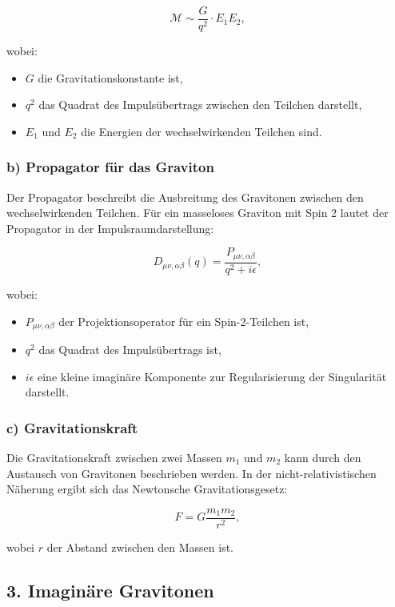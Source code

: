 \documentclass{article}
\begin{document}
\[
\mathcal{M} \sim \frac{G}{q^2} \cdot E_1 E_2,
\]

wobei:

\begin{itemize}
	\item $G$ die Gravitationskonstante ist,
	\item $q^2$ das Quadrat des Impulsübertrags zwischen den Teilchen darstellt,
	\item $E_1$ und $E_2$ die Energien der wechselwirkenden Teilchen sind.
\end{itemize}

\subsubsection{b) Propagator für das Graviton}

Der Propagator beschreibt die Ausbreitung des Gravitonen zwischen den wechselwirkenden Teilchen. Für ein masseloses Graviton mit Spin 2 lautet der Propagator in der Impulsraumdarstellung:

\[
D_{\mu\nu,\alpha\beta}(q) = \frac{P_{\mu\nu,\alpha\beta}}{q^2 + i\epsilon},
\]

wobei:

\begin{itemize}
	\item $P_{\mu\nu,\alpha\beta}$ der Projektionsoperator für ein Spin-2-Teilchen ist,
	\item $q^2$ das Quadrat des Impulsübertrags ist,
	\item $i\epsilon$ eine kleine imaginäre Komponente zur Regularisierung der Singularität darstellt.
\end{itemize}

\subsubsection{c) Gravitationskraft}

Die Gravitationskraft zwischen zwei Massen $m_1$ und $m_2$ kann durch den Austausch von Gravitonen beschrieben werden. In der nicht-relativistischen Näherung ergibt sich das Newtonsche Gravitationsgesetz:

\[
F = G \frac{m_1 m_2}{r^2},
\]

wobei $r$ der Abstand zwischen den Massen ist.

\subsection{3. Imaginäre Gravitonen}
\end{document}
